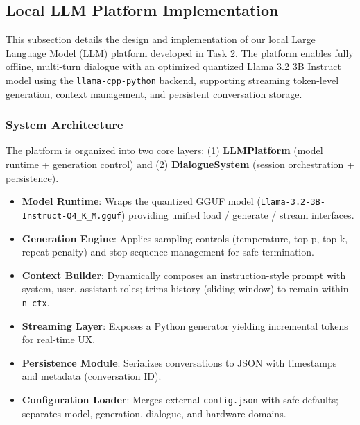 \documentclass[12pt,a4paper]{article}
\begin{document}
\subsection{Local LLM Platform Implementation}


This subsection details the design and implementation of our local Large Language Model (LLM) platform developed in Task 2. The platform enables fully offline, multi-turn dialogue with an optimized quantized Llama 3.2 3B Instruct model using the \texttt{llama-cpp-python} backend, supporting streaming token-level generation, context management, and persistent conversation storage.

\subsubsection*{System Architecture}

The platform is organized into two core layers: (1) \textbf{LLMPlatform} (model runtime + generation control) and (2) \textbf{DialogueSystem} (session orchestration + persistence). 

\begin{itemize}[leftmargin=1.2em]
    \item \textbf{Model Runtime}: Wraps the quantized GGUF model (\texttt{Llama-3.2-3B-Instruct-Q4\_K\_M.gguf}) providing unified load / generate / stream interfaces.  
    \item \textbf{Generation Engine}: Applies sampling controls (temperature, top-p, top-k, repeat penalty) and stop-sequence management for safe termination.  
    \item \textbf{Context Builder}: Dynamically composes an instruction-style prompt with system, user, assistant roles; trims history (sliding window) to remain within \texttt{n\_ctx}.  
    \item \textbf{Streaming Layer}: Exposes a Python generator yielding incremental tokens for real-time UX.  
    \item \textbf{Persistence Module}: Serializes conversations to JSON with timestamps and metadata (conversation ID).  
    \item \textbf{Configuration Loader}: Merges external \texttt{config.json} with safe defaults; separates model, generation, dialogue, and hardware domains.  
\end{itemize}
\end{document}

